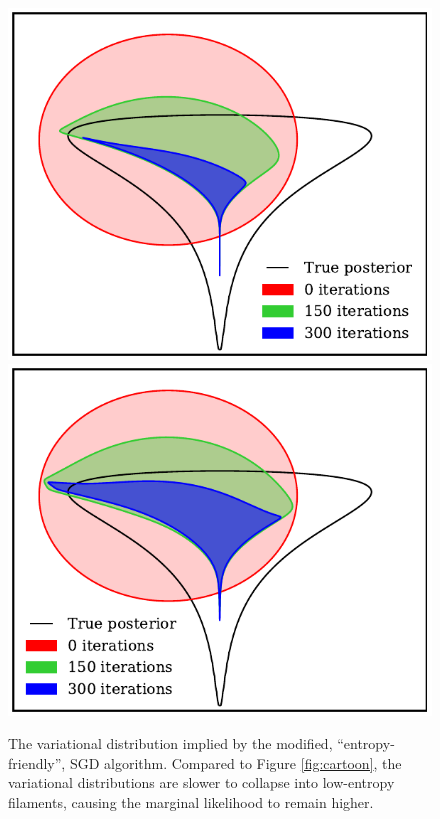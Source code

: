 \documentclass[]{article}
\begin{document}
\begin{figure}
\begin{center}
\includegraphics[width=0.9\columnwidth]{../experiments/2015_03_02_funnel/2/dists.pdf}
\includegraphics[width=0.9\columnwidth]{../experiments/2015_03_02_funnel/3_grad_threshold/dists.pdf}
\caption{The variational distribution implied by the modified, ``entropy-friendly'', SGD algorithm.
Compared to Figure \ref{fig:cartoon}, the variational distributions are slower to collapse into low-entropy filaments, causing the marginal likelihood to remain higher.}
\label{fig:cartoon-fatter}
\end{center}
\end{figure}
\end{document}
